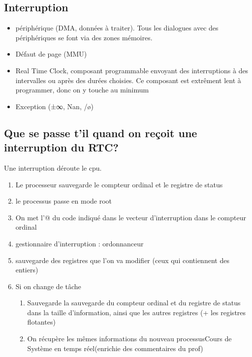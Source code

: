 \documentclass{article}
\begin{document}
\subsection{Interruption}
\begin{itemize}
	\item périphérique (DMA, données à traiter). Tous les dialogues avec des périphériques se font via des zones mémoires.
	\item Défaut de page (MMU)
	\item Real Time Clock, composant programmable envoyant des interruptions à des intervalles ou après des durées choisies. Ce composant est extrêment lent à programmer, donc on y touche au minimum
	\item Exception (±∞, Nan, /ø)
\end{itemize}

\subsection{Que se passe t'il quand on reçoit une interruption du RTC?}
Une interruption déroute le cpu.
\begin{enumerate}
	\item Le processeur sauvegarde le compteur ordinal et le registre de status
	\item le processus passe en mode root
	\item On met l'@ du code indiqué dans le vecteur d'interruption dans le compteur ordinal
	\item gestionnaire d'interruption : ordonnanceur
	\item sauvegarde des registres que l'on va modifier (ceux qui contiennent des entiers)
	\item Si on change de tâche 
	\begin{enumerate}
		\item Sauvegarde la sauvegarde du compteur ordinal et du registre de status dans la taille d'information, ainsi que les autres registres (+ les registres flotantes)
		\item On récupère les mêmes informations du nouveau processusCours de Système en temps réel(enrichie des commentaires du prof)
	\end{enumerate}
\end{enumerate}
\end{document}
